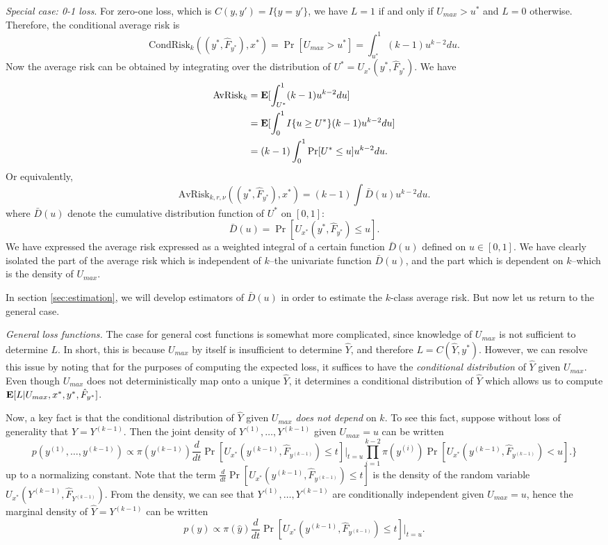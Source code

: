 \documentclass[12pt]{article}
\begin{document}
\noindent \emph{Special case: 0-1 loss}.
For zero-one loss, which is $C(y, y') = I\{y = y'\}$, we have $L=1$ if
and only if $U_{max} > u^*$ and $L=0$ otherwise.  Therefore, the
conditional average risk is
\[
\text{CondRisk}_k((y^*, \hat{F}_{y^*}), x^*) = \Pr[U_{max} > u^*] = \int_{u^*}^1 (k-1) u^{k-2} du.
\]
Now the average risk can be obtained by integrating over the distribution of $U^* = U_{x^*}(y^*, \hat{F}_{y^*})$.
We have
\begin{align*}
\text{AvRisk}_k &= \textbf{E}[ \int_{U^*}^1 (k-1) u^{k-2} du] 
\\&= \textbf{E}[\int_0^1 I\{u \geq U^*\} (k-1) u^{k-2} du ]
\\&= (k-1) \int_0^1 \Pr[U^* \leq u] u^{k-2} du.
\end{align*}
Or equivalently,
\[
\text{AvRisk}_{k, r, \nu}((y^*, \hat{F}_{y^*}), x^*) = (k-1) \int \bar{D}(u) u^{k-2} du.
\]
where $\bar{D}(u)$ denote the cumulative distribution function of $U^*$ on $[0,1]$:
\[
\bar{D}(u) = \Pr[U_{x^*}(y^*, \hat{F}_{y^*}) \leq u].
\]
We have expressed the average risk expressed as a weighted integral of
a certain function $\bar{D}(u)$ defined on $u \in [0,1]$.  We have
clearly isolated the part of the average risk which is independent of
$k$--the univariate function $\bar{D}(u)$, and the part which is
dependent on $k$--which is the density of $U_{max}$.

In section \ref{sec:estimation}, we will develop estimators of
$\bar{D}(u)$ in order to estimate the $k$-class average risk.
But now let us return to the general case.
\newline

\noindent \emph{General loss functions.}
The case for general cost functions is somewhat more complicated,
since knowledge of $U_{max}$ is not sufficient to determine $L$.  In
short, this is because $U_{max}$ by itself is insufficient to
determine $\hat{Y}$, and therefore $L=C(\hat{Y}, y^*)$.  However, we
can resolve this issue by noting that for the purposes of computing
the expected loss, it suffices to have the \emph{conditional
distribution} of $\hat{Y}$ given $U_{max}$.  Even though $U_{max}$
does not deterministically map onto a unique $\hat{Y}$, it determines
a conditional distribution of $\hat{Y}$ which allows us to compute
$\textbf{E}[L|U_{max}, x^*, y^*, \hat{F}_{y^*}]$.

Now, a key fact is that the conditional distribution of $\hat{Y}$
given $U_{max}$ \emph{does not depend} on $k$.  To see this fact,
suppose without loss of generality that $\hat{Y} = Y^{(k-1)}.$ Then
the joint density of $Y^{(1)},\hdots, Y^{(k-1)}$ given $U_{max} =
u$ can be written
\[
p(y^{(1)},\hdots, y^{(k-1)}) \propto 
\pi(y^{(k-1)})\frac{d}{dt}\Pr[U_{x^*}(y^{(k-1)}, \hat{F}_{y^{(k-1)}}) \leq t]|_{t=u}
\prod_{i=1}^{k-2}\pi(y^{(i)})\Pr[U_{x^*}(y^{(k-1)}, \hat{F}_{y^{(k-1)}}) < u].
\}
\]
up to a normalizing constant.  Note that the term
$\frac{d}{dt}\Pr[U_{x^*}(y^{(k-1)}, \hat{F}_{y^{(k-1)}}) \leq t]$ is the
density of the random variable
$U_{x^*}(Y^{(k-1)}, \hat{F}_{Y^{(k-1)}})$. From the density, we can see
that $Y^{(1)},\hdots, Y^{(k-1)}$ are conditionally independent given
$U_{max} = u$, hence the marginal density of $\hat{Y}=Y^{(k-1)}$ can
be written
\[
p(\hat{y}) \propto \pi(\hat{y})\frac{d}{dt}\Pr[U_{x^*}(y^{(k-1)}, \hat{F}_{y^{(k-1)}}) \leq t]|_{t=u}.
\]
\end{document}
